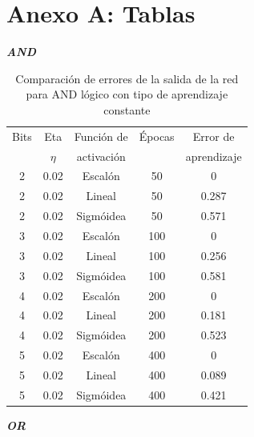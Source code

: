 \documentclass[%
    final,
    reprint,
    notitlepage,
    narroweqnarray,
    inline,
    twoside,
    invited
    ]{ieee}
\begin{document}



\clearpage
\onecolumn
\section*{Anexo A: Tablas}
 
\begin{center}
\textbf{\emph{AND}}
\end{center}

\begin{table}[H]
\begin{center}
\begin{tabular}{|c|c|c|c|c|}
\hline
Bits &  Eta & Función de &  Épocas & Error de\\
 & $\eta$ & activación &  & aprendizaje\\

\hline
\hline

2 & 0.02 & Escalón & 50 & 0\\
\hline
2 & 0.02 & Lineal & 50 & 0.287\\
\hline
2 & 0.02 & Sigmóidea & 50 & 0.571\\
\hline
\hline
3 & 0.02 & Escalón & 100 & 0\\
\hline
3 & 0.02 & Lineal & 100 & 0.256\\
\hline
3 & 0.02 & Sigmóidea & 100 & 0.581\\
\hline
\hline
4 & 0.02 & Escalón & 200 & 0\\
\hline
4 & 0.02 & Lineal & 200 & 0.181\\
\hline
4 & 0.02 & Sigmóidea & 200 & 0.523\\
\hline
\hline
5 & 0.02 & Escalón & 400 & 0\\
\hline
5 & 0.02 & Lineal & 400 & 0.089\\
\hline
5 & 0.02 & Sigmóidea & 400 & 0.421\\
\hline

\end{tabular}
\end{center}
\caption{Comparación de errores de la salida de la red para AND lógico con tipo de aprendizaje constante}\label{tablaIDFS}
\end{table}

\begin{center}
\textbf{\emph{OR}}
\end{center}
\end{document}
